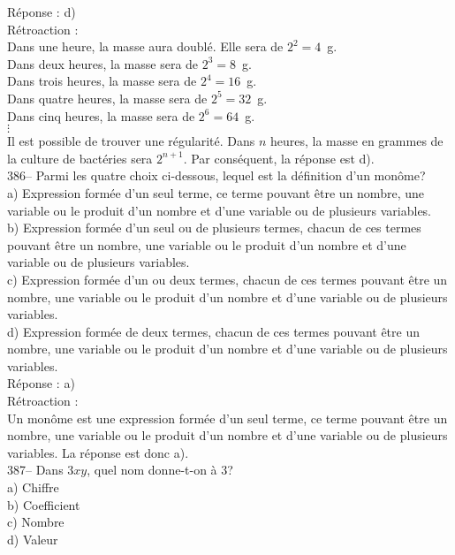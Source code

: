 ﻿\documentclass[letterpaper, 12pt]{article}
\begin{document}
R\'eponse : d)\\


R\'etroaction : \\
Dans une heure, la masse aura doubl\'e.  Elle sera de $2^{2}=4$~g.\\
Dans deux heures, la masse sera de $2^{3}=8$~g.\\
Dans trois heures, la masse sera de $2^{4}=16$~g.\\
Dans quatre heures, la masse sera de $2^{5}=32$~g.\\
Dans cinq heures, la masse sera de $2^{6}=64$~g.\\
$\vdots$\\
Il est possible de trouver une r\'egularit\'e.  Dans $n$ heures, la masse en
grammes de la culture de bact\'eries sera $2^{n+1}$.  Par cons\'equent, la
r\'eponse est d).\\

386-- Parmi les quatre choix ci-dessous, lequel est la d\'efinition d'un
mon\^ome?\\
a) Expression form\'ee d'un seul terme, ce terme pouvant \^etre un nombre,
une variable ou le produit d'un nombre et d'une variable ou de plusieurs
variables.\\
b) Expression form\'ee d'un seul ou de plusieurs termes, chacun de ces
termes pouvant \^etre un nombre, une variable ou le produit d'un nombre et
d'une variable ou de plusieurs variables.\\
c) Expression form\'ee d'un ou deux termes, chacun de ces termes pouvant
\^etre un nombre, une variable ou le produit d'un nombre et d'une variable
ou de plusieurs variables.\\
d) Expression form\'ee de deux termes, chacun de ces termes pouvant \^etre
un nombre, une variable ou le produit d'un nombre et d'une variable ou de
plusieurs variables.\\

R\'eponse : a)\\

R\'etroaction : \\
Un mon\^ome est une expression form\'ee d'un seul terme, ce terme pouvant
\^etre un nombre, une variable ou le produit d'un nombre et d'une variable
ou de plusieurs variables.  La r\'eponse est donc a).\\

387--  Dans $3xy$, quel nom donne-t-on \`a 3?\\
a) Chiffre\\
b) Coefficient\\
c) Nombre\\
d) Valeur\\
\end{document}
